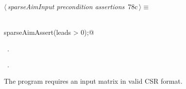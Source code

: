 \documentclass{article}
\begin{document}
\begin{flushleft} \small
\begin{minipage}{\linewidth}\label{scrap122}\raggedright\small
{} $\langle\,${\itshape sparseAimInput precondition assertions}\nobreak\ {\footnotesize {78c}}$\,\rangle\equiv$
\vspace{-1ex}
\begin{list}{}{} \item
\mbox{}\verb@@\\
\mbox{}\verb@      sparseAimAssert(leads > 0);@\\
\mbox{}\verb@@{\NWsep}
\end{list}
\vspace{-1.5ex}
\footnotesize
\begin{list}{}{\setlength{\itemsep}{-\parsep}\setlength{\itemindent}{-\leftmargin}}
\item \NWtxtMacroDefBy\ .
\item \NWtxtMacroRefIn\ .

\item{}
\end{list}
\end{minipage}\vspace{4ex}
\end{flushleft}
The program requires an input matrix in valid CSR format.
\end{document}
